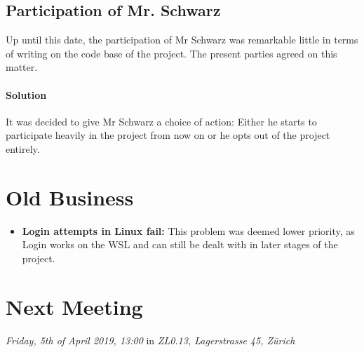 \documentclass[10pt,a4paper,twoside,english,minutes]{zhawreprt}
\begin{document}
\subsection{Participation of Mr. Schwarz}
Up until this date, the participation of Mr Schwarz was remarkable little in terms of writing on the code base of the project. The present parties agreed on this matter.
\paragraph{Solution}
It was decided to give Mr Schwarz a choice of action: Either he starts to participate heavily in the project from now on or he opts out of the project entirely.

\section{Old Business}
\begin{itemize}
\item \textbf{Login attempts in Linux fail: } This problem was deemed lower priority, as Login works
on the WSL and can still be dealt with in later stages of the project.
\end{itemize}

\section*{Next Meeting}
\textit{Friday, 5th of April 2019, 13:00} in \textit{ZL0.13, Lagerstrasse 45, Zürich}
\end{document}
